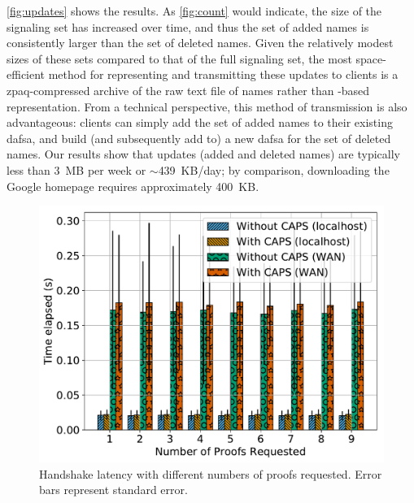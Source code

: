 \autoref{fig:updates} shows the results. As
\autoref{fig:count} would indicate, the size of the signaling set has increased
over time, and thus the set of added names is consistently larger than the set
of deleted names. Given the relatively modest sizes of these sets compared to
that of the full signaling set, the most space-efficient method for representing
and transmitting these updates to clients is a zpaq-compressed archive
of the raw text file of names rather than -based representation. From
a technical perspective, this method of transmission is also advantageous:
clients can simply add the set of added names to their existing \ac{dafsa}, and
build (and subsequently add to) a new \ac{dafsa} for the set of deleted names.
Our results show that updates (added and deleted names) are typically less than
3~MB per week or $\sim$439~KB/day; by comparison, downloading the Google
homepage requires approximately 400~KB.


\begin{figure}[t]
  \centering
  \includegraphics[width=\linewidth]{fig/eval_tls_ext/0-time_elapsed_vs_num_proofs_requested}
  \caption{Handshake latency with different numbers of proofs requested. Error
  bars represent standard error.}
  \label{fig:evaltlsext:numproof}
\end{figure}

